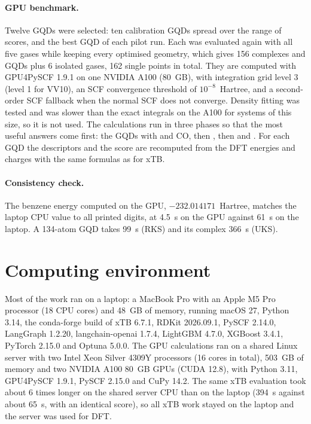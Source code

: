 \paragraph{GPU benchmark.} Twelve GQDs were selected: ten calibration GQDs spread over the range of
scores, and the best GQD of each pilot run. Each was evaluated again with all five gases while
keeping every optimised geometry, which gives 156 complexes and GQDs plus 6 isolated gases, 162
single points in total. They are computed with GPU4PySCF 1.9.1 \cite{li2025gpu4pyscf} on one
NVIDIA A100 (80~GB), with integration grid level 3 (level 1 for VV10), an SCF convergence threshold
of \(10^{-8}\)~Hartree, and a second-order SCF fallback when the normal SCF does not converge.
Density fitting was tested and was slower than the exact integrals on the A100 for systems of this
size, so it is not used. The calculations run in three phases so that the most useful answers come
first: the GQDs with  and CO, then , then  and . For each GQD the
descriptors and the score are recomputed from the DFT energies and charges with the same
formulas as for xTB.

\paragraph{Consistency check.} The benzene energy computed on the GPU, \(-232.014171\)~Hartree,
matches the laptop CPU value to all printed digits, at 4.5~s on the GPU against 61~s on the
laptop. A 134-atom GQD takes 99~s (RKS) and its  complex 366~s (UKS).

\section{Computing environment}
\label{sec:compute}

Most of the work ran on a laptop: a MacBook Pro with an Apple M5 Pro processor (18 CPU cores) and
48~GB of memory, running macOS 27, Python 3.14, the conda-forge build of xTB 6.7.1, RDKit
2026.09.1, PySCF 2.14.0, LangGraph 1.2.20, langchain-openai 1.7.4, LightGBM 4.7.0, XGBoost 3.4.1,
PyTorch 2.15.0 and Optuna 5.0.0. The GPU calculations ran on a shared Linux server with two Intel
Xeon Silver 4309Y processors (16 cores in total), 503~GB of memory and two NVIDIA A100 80~GB GPUs
(CUDA 12.8), with Python 3.11, GPU4PySCF 1.9.1, PySCF 2.15.0 and CuPy 14.2. The same xTB evaluation
took about 6 times longer on the shared server CPU than on the laptop (394~s against about 65~s,
with an identical score), so all xTB work stayed on the laptop and the server was used for DFT.
